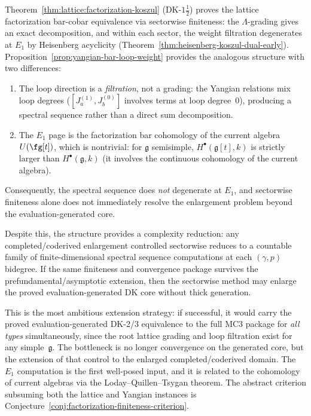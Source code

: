 \begin{remark}
\label{rem:sectorwise-vs-lattice}
Theorem~\ref{thm:lattice:factorization-koszul}
(DK-$1\frac{1}{2}$) proves the lattice factorization bar-cobar
equivalence via sectorwise finiteness: the $\Lambda$-grading gives
an exact decomposition, and within each sector, the weight
filtration degenerates at $E_1$ by Heisenberg acyclicity
(Theorem~\ref{thm:heisenberg-koszul-dual-early}).
Proposition~\ref{prop:yangian-bar-loop-weight} provides the
analogous structure with two differences:
\begin{enumerate}[label=\textup{(\alph*)}]
\item The loop direction is a \emph{filtration}, not a grading:
  the Yangian relations mix loop degrees
  ($[J^{(1)}_a, J^{(0)}_b]$ involves terms at loop degree~$0$),
  producing a spectral sequence rather than a direct sum
  decomposition.
\item The $E_1$ page is the factorization bar cohomology of the
  current algebra $U(\fg[t])$, which is nontrivial:
  for $\mathfrak{g}$ semisimple,
  $H^\bullet(\mathfrak{g}[t], k)$ is strictly larger than
  $H^\bullet(\mathfrak{g}, k)$
  (it involves the continuous cohomology of the current algebra).
\end{enumerate}
Consequently, the spectral sequence does \emph{not} degenerate at
$E_1$, and sectorwise finiteness alone does not immediately resolve
the enlargement problem beyond the evaluation-generated core.

Despite this, the structure provides a complexity reduction: any
completed/coderived enlargement controlled sectorwise reduces to a
countable family of finite-dimensional spectral sequence
computations at each $(\gamma, p)$ bidegree.  If the same finiteness
and convergence package survives the prefundamental/asymptotic
extension, then the sectorwise method may enlarge the proved
evaluation-generated DK core without thick generation.

This is the most ambitious extension strategy: if successful, it
would carry the proved evaluation-generated DK-2/3 equivalence to the
full MC3 package for \emph{all types} simultaneously, since the root
lattice grading and loop filtration exist for any
simple~$\mathfrak{g}$.  The bottleneck is no longer convergence on
the generated core, but the extension of that control to the enlarged
completed/coderived domain.  The $E_1$ computation is the first
well-posed input, and it is related to the cohomology of current
algebras via the Loday--Quillen--Tsygan theorem.
The abstract criterion subsuming both the lattice and Yangian
instances is
Conjecture~\ref{conj:factorization-finiteness-criterion}.
\end{remark}

